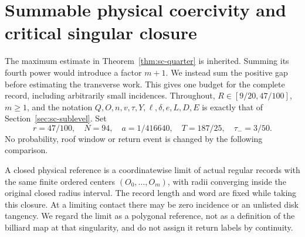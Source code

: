 \section{Summable physical coercivity and critical singular closure}
\label{sec:ss-coercivity}
The maximum estimate in Theorem~\ref{thm:sc-quarter} is inherited.
Summing its fourth power would introduce a factor $m+1$. We instead
sum the positive gap before estimating the transverse work. This gives
one budget for the complete record, including arbitrarily small incidences.
Throughout, $R\in[9/20,47/100]$, $m\ge1$, and the notation
$Q,O,n,v,\tau,Y,\ell,\delta,e,L,D,E$ is exactly that of
Section~\ref{sec:sc-sublevel}. Set
\begin{equation}\label{eq:ss-constants}
 r=47/100,\quad N=94,\quad a=1/416640,\quad
 T=187/25,\quad \tau_-=3/50.
\end{equation}
No probability, roof window or return event is changed by the following
comparison.

\begin{definition}\label{def:ss-closure}
A closed physical reference is a coordinatewise limit of actual regular
records with the same finite ordered centers $(O_0,\ldots,O_m)$, with
radii converging inside the original closed radius interval. The record
length and word are fixed while taking this closure. At a limiting
contact there may be zero incidence or an unlisted disk tangency. We
regard the limit as a polygonal reference, not as a definition of the
billiard map at that singularity, and do not assign it return labels by
continuity.
\end{definition}

